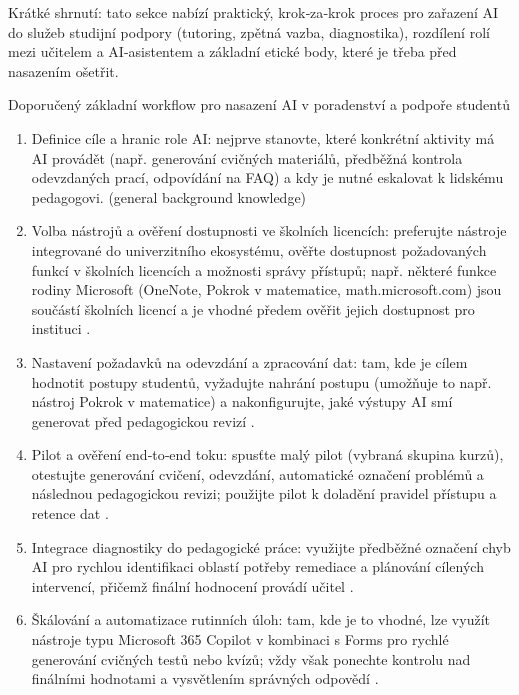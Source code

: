 Krátké shrnutí: tato sekce nabízí praktický, krok‑za‑krok proces pro zařazení AI do služeb studijní podpory (tutoring, zpětná vazba, diagnostika), rozdílení rolí mezi učitelem a AI‑asistentem a základní etické body, které je třeba před nasazením ošetřit.

Doporučený základní workflow pro nasazení AI v poradenství a podpoře studentů
\begin{enumerate}
  \item Definice cíle a hranic role AI: nejprve stanovte, které konkrétní aktivity má AI provádět (např. generování cvičných materiálů, předběžná kontrola odevzdaných prací, odpovídání na FAQ) a kdy je nutné eskalovat k lidskému pedagogovi. (general background knowledge)
  \item Volba nástrojů a ověření dostupnosti ve školních licencích: preferujte nástroje integrované do univerzitního ekosystému, ověřte dostupnost požadovaných funkcí v školních licencích a možnosti správy přístupů; např. některé funkce rodiny Microsoft (OneNote, Pokrok v matematice, math.microsoft.com) jsou součástí školních licencí a je vhodné předem ověřit jejich dostupnost pro instituci \cite{kb_ai_101_tipu_pdf_04e4a115_page_8_1}. 
  \item Nastavení požadavků na odevzdání a zpracování dat: tam, kde je cílem hodnotit postupy studentů, vyžadujte nahrání postupu (umožňuje to např. nástroj Pokrok v matematice) a nakonfigurujte, jaké výstupy AI smí generovat před pedagogickou revizí \cite{kb_ai_101_tipu_pdf_04e4a115_page_8_1}.
  \item Pilot a ověření end‑to‑end toku: spusťte malý pilot (vybraná skupina kurzů), otestujte generování cvičení, odevzdání, automatické označení problémů a následnou pedagogickou revizi; použijte pilot k doladění pravidel přístupu a retence dat \cite{kb_ai_101_tipu_pdf_04e4a115_page_8_1}.
  \item Integrace diagnostiky do pedagogické práce: využijte předběžné označení chyb AI pro rychlou identifikaci oblastí potřeby remediace a plánování cílených intervencí, přičemž finální hodnocení provádí učitel \cite{kb_ai_101_tipu_pdf_04e4a115_page_8_1}.
  \item Škálování a automatizace rutinních úloh: tam, kde je to vhodné, lze využít nástroje typu Microsoft 365 Copilot v kombinaci s Forms pro rychlé generování cvičných testů nebo kvízů; vždy však ponechte kontrolu nad finálními hodnotami a vysvětlením správných odpovědí \cite{kb_ai_101_tipu_pdf_04e4a115_page_36_1}.
\end{enumerate}


